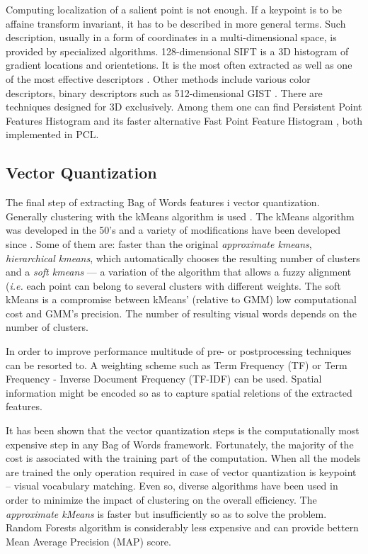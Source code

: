 \documentclass[a4paper,12pt]{article}
\begin{document}
	Computing localization of a salient point is not enough. If a keypoint is to be affaine transform invariant, it has to be described in more general terms. Such description, usually in a form of coordinates in a multi-dimensional space, is provided by specialized algorithms. 128-dimensional SIFT \cite{sift_features} is a 3D histogram of gradient locations and orientetions. It is the most often extracted as well as one of the most effective descriptors \cite{tsai2012bag}. Other methods include various color descriptors, binary descriptors such as 512-dimensional GIST \cite{ponce2011cv}. There are techniques designed for 3D exclusively. Among them one can find Persistent Point Features Histogram \cite{pfh_rusu2008} and its faster alternative Fast Point Feature Histogram \cite{fpfh_rusu2009}, both implemented in PCL.

\subsection{Vector Quantization}

	The final step of extracting Bag of Words features i vector quantization. Generally clustering with the kMeans algorithm is used \cite{tsai2012bag}. The kMeans algorithm was developed in the 50's and a variety of modifications have been developed since \cite{kmeans_jain2010data}. Some of them are: faster than the original \emph{approximate kmeans}, \emph{hierarchical kmeans}, which automatically chooses the resulting number of clusters and a  \emph{soft kmeans} --- a variation of the algorithm that allows a fuzzy alignment (\textit{i.e.} each point can belong to several clusters with different weights. The soft kMeans is a compromise between kMeans' (relative to GMM) low computational cost and GMM's precision. The number of resulting visual words depends on the number of clusters.
	
	In order to improve performance multitude of pre- or postprocessing techniques can be resorted to. A weighting scheme such as Term Frequency (TF) or Term Frequency - Inverse Document Frequency (TF-IDF) can be used. Spatial information might be encoded so as to capture spatial reletions of the extracted features.
	
	It has been shown that the vector quantization steps is the computationally most expensive step in any Bag of Words framework. Fortunately, the majority of the cost is associated with the training part of the computation. When all the models are trained the only operation required in case of vector quantization is keypoint -- visual vocabulary matching. Even so, diverse algorithms have been used in order to minimize the impact of clustering on the overall efficiency. The \emph{approximate kMeans} is faster but insufficiently so as to solve the problem. Random Forests algorithm is considerably less expensive and can provide bettern Mean Average Precision (MAP) score.
	
\end{document}

